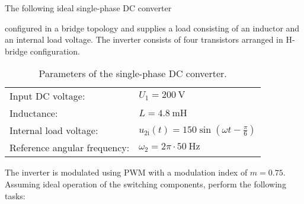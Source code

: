 

The following ideal single-phase DC converter
 

configured in a bridge topology and supplies a load consisting of an inductor and an internal load voltage. The inverter consists
of four transistors arranged in H-bridge configuration.

\begin{table}[ht]
    \centering  %
    \begin{tabular}{ll}
        \toprule
        Input DC voltage: & $U_{\mathrm{1}}=\SI{200}{\volt}$ \\
        Inductance: & $L = \SI{4.8}{\milli \henry}$ \\
        Internal load voltage: & $u_{2\mathrm{i}}(t) = 150 \sin(\omega t - \frac{\pi}{6})$ \\ 
        Reference angular frequency: & $\omega_2 = 2\pi \cdot \SI{50}{\hertz}$ \\ 
        \bottomrule
    \end{tabular}
    \caption{Parameters of the single-phase DC converter.}  
    \label{table:ex07_Task1_ParametersOfTheCircuit}
\end{table}
The inverter is modulated using PWM with a modulation index of $m=0.75$.  Assuming ideal operation of the switching components, perform the following tasks:


